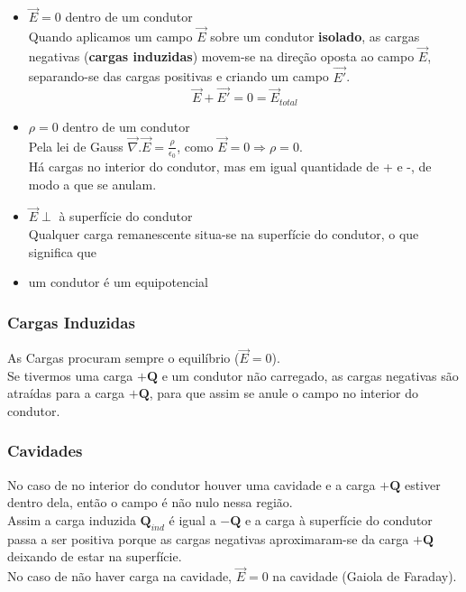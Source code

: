 \documentclass[11pt]{article}
\begin{document}
\begin{itemize}
    \item $\overrightarrow{E} = 0$ dentro de um condutor\\[6pt]
    Quando aplicamos um campo $\overrightarrow{E}$ sobre um condutor \textbf{isolado}, as cargas negativas (\textbf{cargas induzidas}) movem-se na direção oposta ao campo $\overrightarrow{E}$, separando-se das cargas positivas e criando um campo $\overrightarrow{E'}$.
    \[ \overrightarrow{E} + \overrightarrow{E'} = 0 = \overrightarrow{E}_{total} \]
    \item $\rho = 0$ dentro de um condutor\\[6pt]
    Pela lei de Gauss $\displaystyle \overrightarrow{\nabla}.\overrightarrow{E}=\frac{\rho}{\epsilon_0}$, como $\overrightarrow{E} = 0 \Longrightarrow \rho = 0$.\\
    Há cargas no interior do condutor, mas em igual quantidade de + e -, de modo a que se anulam.
    \item $\overrightarrow{E} \perp$ à superfície do condutor\\[6pt]
    Qualquer carga remanescente situa-se na superfície do condutor, o que significa que 
    \item um condutor é um equipotencial
\end{itemize}

\subsubsection{Cargas Induzidas}

As Cargas procuram sempre o equilíbrio ($\overrightarrow{E}=0$).\\[2pt]
Se tivermos uma carga $+\mathbf{Q}$ e um condutor não carregado, as cargas negativas são atraídas para a carga $+\mathbf{Q}$, para que assim se anule o campo no interior do condutor.

\subsubsection{Cavidades}

No caso de no interior do condutor houver uma cavidade e a carga $+\mathbf{Q}$ estiver dentro dela, então o campo é não nulo nessa região.\\[2pt]
Assim a carga induzida $\mathbf{Q}_{ind}$ é igual a $-\mathbf{Q}$ e a carga à superfície do condutor passa a ser positiva porque as cargas negativas aproximaram-se da carga $+\mathbf{Q}$ deixando de estar na superfície.\\[2pt]
No caso de não haver carga na cavidade, $\overrightarrow{E}=0$ na cavidade (Gaiola de Faraday).
\end{document}
